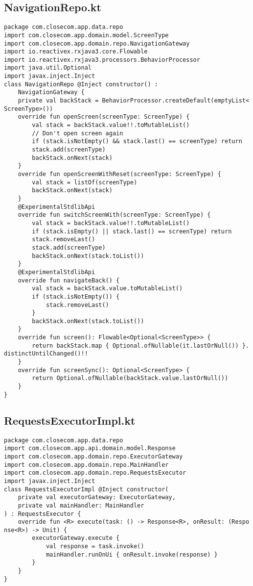 \documentclass[listing]{espd}
\begin{document}
\subsection{NavigationRepo.kt}
\begin{verbatim}
package com.closecom.app.data.repo
import com.closecom.app.domain.model.ScreenType
import com.closecom.app.domain.repo.NavigationGateway
import io.reactivex.rxjava3.core.Flowable
import io.reactivex.rxjava3.processors.BehaviorProcessor
import java.util.Optional
import javax.inject.Inject
class NavigationRepo @Inject constructor() :
    NavigationGateway {
    private val backStack = BehaviorProcessor.createDefault(emptyList<
ScreenType>())
    override fun openScreen(screenType: ScreenType) {
        val stack = backStack.value!!.toMutableList()
        // Don't open screen again
        if (stack.isNotEmpty() && stack.last() == screenType) return
        stack.add(screenType)
        backStack.onNext(stack)
    }
    override fun openScreenWithReset(screenType: ScreenType) {
        val stack = listOf(screenType)
        backStack.onNext(stack)
    }
    @ExperimentalStdlibApi
    override fun switchScreenWith(screenType: ScreenType) {
        val stack = backStack.value!!.toMutableList()
        if (stack.isEmpty() || stack.last() == screenType) return
        stack.removeLast()
        stack.add(screenType)
        backStack.onNext(stack.toList())
    }
    @ExperimentalStdlibApi
    override fun navigateBack() {
        val stack = backStack.value.toMutableList()
        if (stack.isNotEmpty()) {
            stack.removeLast()
        }
        backStack.onNext(stack.toList())
    }
    override fun screen(): Flowable<Optional<ScreenType>> {
        return backStack.map { Optional.ofNullable(it.lastOrNull()) }.
distinctUntilChanged()!!
    }
    override fun screenSync(): Optional<ScreenType> {
        return Optional.ofNullable(backStack.value.lastOrNull())
    }
}
\end{verbatim}

\subsection{RequestsExecutorImpl.kt}
\begin{verbatim}
package com.closecom.app.data.repo
import com.closecom.app.api.domain.model.Response
import com.closecom.app.domain.repo.ExecutorGateway
import com.closecom.app.domain.repo.MainHandler
import com.closecom.app.domain.repo.RequestsExecutor
import javax.inject.Inject
class RequestsExecutorImpl @Inject constructor(
    private val executorGateway: ExecutorGateway,
    private val mainHandler: MainHandler
) : RequestsExecutor {
    override fun <R> execute(task: () -> Response<R>, onResult: (Respo
nse<R>) -> Unit) {
        executorGateway.execute {
            val response = task.invoke()
            mainHandler.runOnUi { onResult.invoke(response) }
        }
    }
}
\end{verbatim}
\end{document}
